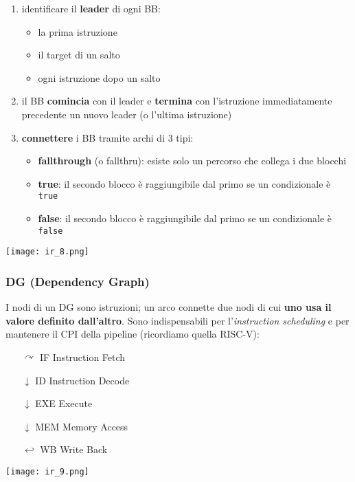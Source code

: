 \noindent\begin{minipage}[c]{.65\textwidth}
\begin{enumerate}
  \item identificare il \textbf{leader} di ogni BB:
    \begin{itemize}
      \item la prima istruzione
      \item il target di un salto
      \item ogni istruzione dopo un salto
    \end{itemize}
  \item il BB \textbf{comincia} con il leader e \textbf{termina} con l'istruzione immediatamente precedente un nuovo leader (o l'ultima istruzione)
  \item \textbf{connettere} i BB tramite archi di 3 tipi:
    \begin{itemize}
      \item \textbf{fallthrough} (o fallthru): esiste solo un percorso che collega i due blocchi
      \item \textbf{true}: il secondo blocco \`e raggiungibile dal primo se un condizionale \`e \lstinline|true|
      \item \textbf{false}: il secondo blocco \`e raggiungibile dal primo se un condizionale \`e \lstinline|false|
    \end{itemize}
\end{enumerate}
\end{minipage}\hfill
\begin{minipage}[c]{.3\textwidth}
\texttt{[image: ir\_8.png]}
\end{minipage}

\subsubsection{DG (Dependency Graph)}

I nodi di un DG sono istruzioni; un arco connette due nodi di cui \textbf{uno usa il valore definito dall'altro}. Sono indispensabili per l'\textit{instruction scheduling} e per mantenere il CPI della pipeline (ricordiamo quella RISC-V):\\

\noindent\begin{minipage}[c]{.6\textwidth}
\begin{itemize}
  \item[$\curvearrowright$] IF Instruction Fetch
  \item[$\downarrow$] ID Instruction Decode
  \item[$\downarrow$] EXE Execute
  \item[$\downarrow$] MEM Memory Access
  \item[$\hookleftarrow$] WB Write Back
\end{itemize}
\end{minipage}
\begin{minipage}[c]{.4\textwidth}
  \centering
\texttt{[image: ir\_9.png]}
\end{minipage}\\

